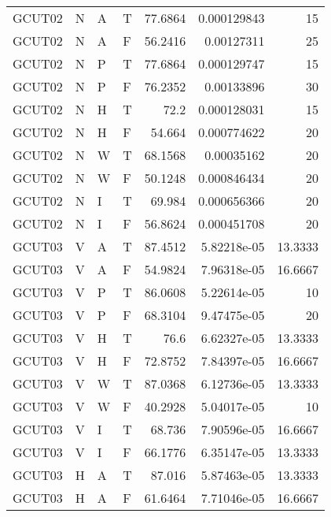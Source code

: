 \begin{longtable}{llllrrr}
    GCUT02   & N     & A     & T          & 77.6864    & 0.000129843 & 15       \\
    GCUT02   & N     & A     & F          & 56.2416    & 0.00127311  & 25       \\
    GCUT02   & N     & P     & T          & 77.6864    & 0.000129747 & 15       \\
    GCUT02   & N     & P     & F          & 76.2352    & 0.00133896  & 30       \\
    GCUT02   & N     & H     & T          & 72.2       & 0.000128031 & 15       \\
    GCUT02   & N     & H     & F          & 54.664     & 0.000774622 & 20       \\
    GCUT02   & N     & W     & T          & 68.1568    & 0.00035162  & 20       \\
    GCUT02   & N     & W     & F          & 50.1248    & 0.000846434 & 20       \\
    GCUT02   & N     & I     & T          & 69.984     & 0.000656366 & 20       \\
    GCUT02   & N     & I     & F          & 56.8624    & 0.000451708 & 20       \\
    GCUT03   & V     & A     & T          & 87.4512    & 5.82218e-05 & 13.3333  \\
    GCUT03   & V     & A     & F          & 54.9824    & 7.96318e-05 & 16.6667  \\
    GCUT03   & V     & P     & T          & 86.0608    & 5.22614e-05 & 10       \\
    GCUT03   & V     & P     & F          & 68.3104    & 9.47475e-05 & 20       \\
    GCUT03   & V     & H     & T          & 76.6       & 6.62327e-05 & 13.3333  \\
    GCUT03   & V     & H     & F          & 72.8752    & 7.84397e-05 & 16.6667  \\
    GCUT03   & V     & W     & T          & 87.0368    & 6.12736e-05 & 13.3333  \\
    GCUT03   & V     & W     & F          & 40.2928    & 5.04017e-05 & 10       \\
    GCUT03   & V     & I     & T          & 68.736     & 7.90596e-05 & 16.6667  \\
    GCUT03   & V     & I     & F          & 66.1776    & 6.35147e-05 & 13.3333  \\
    GCUT03   & H     & A     & T          & 87.016     & 5.87463e-05 & 13.3333  \\
    GCUT03   & H     & A     & F          & 61.6464    & 7.71046e-05 & 16.6667  \\

\end{longtable}
